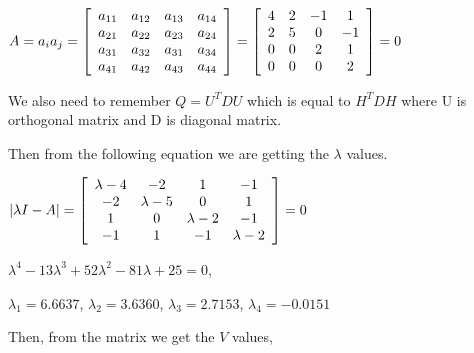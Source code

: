 \documentclass[]{article}
\begin{document}
\vspace{0.5em}

\centerline {
	$A = a_ia_j = \left[ {\begin{array}{*{20}c}
		a_{11} & a_{12} & a_{13} & a_{14} \\
		a_{21} & a_{22} & a_{23} & a_{24} \\ 
		a_{31} & a_{32} & a_{31} &  a_{34} \\
		a_{41} & a_{42} & a_{43} & a_{44}  
		\end{array} } \right] =  \left[ {\begin{array}{*{20}c}
		4 & 2 & -1 & 1 \\
		2 & 5 & 0 & -1 \\ 
		0 & 0 & 2 &  1 \\
		0 & 0 & 0 & 2  
		\end{array} } \right] = 0 $ 
}

\vspace{0.5em}

We also need to remember $Q = U^TDU$ which is equal to $H^TDH$ where U is orthogonal matrix and D is diagonal matrix. 

Then from the following equation we are getting the $\lambda$ values. 

\vspace{0.5em}

\centerline {
	$|\lambda I - A| = \left[ {\begin{array}{*{20}c}
		\lambda - 4 & -2 & 1 & -1 \\
		-2 & \lambda - 5 & 0 & 1 \\ 
		1 & 0 & \lambda - 2 &  -1 \\
		-1 & 1 & -1 & \lambda - 2  
		\end{array} } \right] = 0$
}

\vspace{1.0em}

\centerline {
	$\lambda ^4 - 13 \lambda ^3 + 52 \lambda ^2 - 81 \lambda + 25 = 0$, 
}

\vspace{1.0em}

\centerline {
	$\lambda _1 = 6.6637$, $\lambda _2 = 3.6360$, $\lambda _3 = 2.7153$, $\lambda _4 = -0.0151$
}

\vspace{1.0em}

Then, from the matrix we get the $V$ values, 

\vspace{0.5em}
\end{document}
